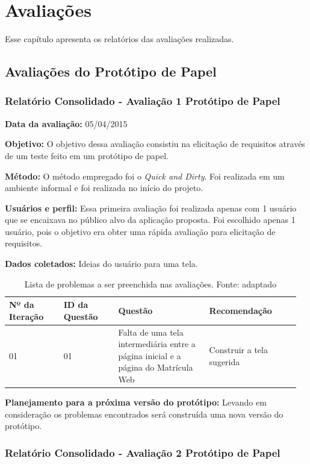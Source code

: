 \chapter{Avaliações}
Esse capítulo apresenta os relatórios das avaliações realizadas.

\section{Avaliações do Protótipo de Papel}

\subsection{Relatório Consolidado - Avaliação 1 Protótipo de Papel}

\textbf{Data da avaliação:} 05/04/2015

\textbf{Objetivo:}
O objetivo dessa avaliação consistiu na elicitação de requisitos através de um teste feito em um protótipo de papel.

\textbf{Método:}
O método empregado foi o \textit{Quick and Dirty}\cite{preece}. Foi realizada em um ambiente informal e foi realizada no início do projeto.

\textbf{Usuários e perfil:}
Essa primeira avaliação foi realizada apenas com 1 usuário que se encaixava no público alvo da aplicação proposta. Foi escolhido apenas 1 usuário, pois o objetivo era obter uma rápida avaliação para elicitação de requisitos.

\textbf{Dados coletados:}
Ideias do usuário para uma tela.

\begin{table}[!h]
\caption{Lista de problemas a ser preenchida nas avaliações. Fonte: \cite{preece} adaptado}
\label{tab:problema}
  \begin{tabular}{p{0.18\linewidth}p{0.18\linewidth}p{0.30\linewidth}p{0.30\linewidth}}
  \hline
    Nº da Iteração & ID da Questão & Questão & Recomendação\\
 \hline
    01 & 01 & Falta de uma tela intermediária entre a página inicial e a página do Matrícula Web & Construir a tela sugerida\\
  \end{tabular}
\end{table}

\textbf{Planejamento para a próxima versão do protótipo:}
Levando em consideração os problemas encontrados será construída uma nova versão do protótipo. 
\vfill
\pagebreak

\subsection{Relatório Consolidado - Avaliação 2 Protótipo de Papel}

